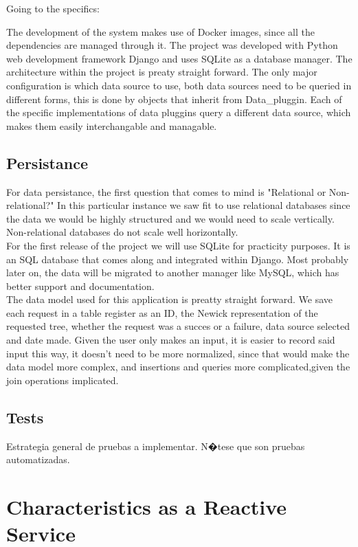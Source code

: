 \documentclass[10pt]{article}
\begin{document}
 Going to the specifics:
 
The development of the system makes use of Docker images, since all the dependencies are managed through it. The project was developed with Python web development framework Django and uses SQLite as a database manager. The architecture within the project is preaty straight forward. The only major configuration is which data source to use, both data sources need to be queried in different forms, this is done by objects that inherit from Data\_pluggin. Each of the specific implementations of data pluggins query a different data source, which makes them easily interchangable and managable.

 \subsection{Persistance}
 
For data persistance, the first question that comes to mind is "Relational or Non-relational?" In this particular instance we saw fit to use relational databases since the data we would be highly structured and we would need to scale vertically. Non-relational databases do not scale well horizontally.\\

For the first release of the project we will use SQLite for practicity purposes. It is an SQL database that comes along and integrated within Django. Most probably later on, the data will be migrated to another manager like MySQL, which has better support and documentation.\\

The data model used for this application is preatty straight forward. We save each request in a table register as an ID, the Newick representation of the requested tree, whether the request was a succes or a failure, data source selected and date made. Given the user only makes an input, it is easier to record said input this way, it doesn't need to be more normalized, since that would make the data model more complex, and insertions and queries more complicated,given the join operations implicated.
 
 \subsection{Tests}
 Estrategia general de pruebas a implementar. N�tese que son pruebas automatizadas.

\section{Characteristics as a Reactive Service}
\end{document}
